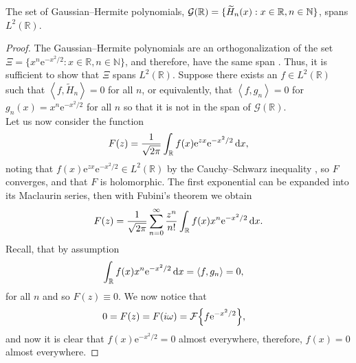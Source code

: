 \begin{theorem}
\label{thm:hermite}
The set of Gaussian--Hermite polynomials, $\mathcal{G}(\mathbb{R}) = \{ \Her{n}{x} : x \in \mathbb{R}, n \in \mathbb{N} \}$, spans $L^2(\mathbb{R})$.
\end{theorem}
\begin{proof}
The Gaussian--Hermite polynomials are an orthogonalization of the set $\Xi = \{x^n \textrm{e}^{-x^2/2} : x \in \mathbb{R}, n \in \mathbb{N}\}$, and therefore, have the same span \cite{kreyszig, szego}. Thus, it is sufficient to show that $\Xi$ spans $L^2(\mathbb{R})$.
Suppose there exists an $f \in L^2(\mathbb{R})$ such that $\left< f, \widetilde{H}_n \right> = 0$ for all $n$, or equivalently, that $\left< f, g_n \right> = 0$ for $g_n(x) = x^n \textrm{e}^{-x^2/2}$ for all $n$ so that it is not in the span of $\mathcal{G}(\mathbb{R})$. \\

Let us now consider the function \cite{courant, szego, teuwen}
\begin{align*}
F(z) = \frac{1}{\sqrt{2\pi}}\int_\mathbb{R} f(x) \textrm{e}^{zx} \textrm{e}^{-x^2/2} \, \textrm{d} x,
\end{align*}
noting that $f(x) \textrm{e}^{zx} \textrm{e}^{-x^2/2} \in L^2(\mathbb{R})$ by the Cauchy--Schwarz inequality \cite{griffel, kolmogorov}, so $F$ converges, and that $F$ is holomorphic. The first exponential can be expanded into its Maclaurin series, then with Fubini's theorem we obtain
\begin{align*}
F(z) = \frac{1}{\sqrt{2\pi}} \sum_{n = 0}^{\infty} \frac{z^n}{n!} \int_\mathbb{R} f(x) x^n \textrm{e}^{-x^2/2} \, \textrm{d} x.
\end{align*}
Recall, that by assumption
\begin{align*}
\int_\mathbb{R} f(x) x^n \textrm{e}^{-x^2/2} \, \df x &= \left< f, g_n \right> = 0,
\end{align*}
for all $n$ and so $F(z) \equiv 0$. We now notice that
\begin{align*}
0 &= F(z) = F(i \omega) = \FT{f \textrm{e}^{-x^2/2}},
\end{align*}
and now it is clear that $f(x) \textrm{e}^{-x^2/2} = 0$ almost everywhere, therefore, $f(x) = 0$ almost everywhere.
\end{proof}

